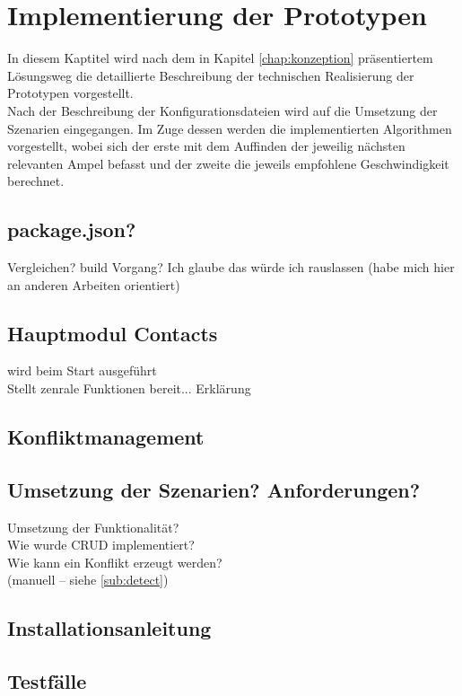 \chapter{\label{chap:implementierung}Implementierung der Prototypen}
In diesem Kaptitel wird nach dem in Kapitel \ref{chap:konzeption} präsentiertem Lösungsweg die detaillierte Beschreibung der technischen Realisierung der Prototypen vorgestellt.\\
Nach der Beschreibung der Konfigurationsdateien wird auf die Umsetzung der Szenarien eingegangen. Im Zuge dessen werden die implementierten Algorithmen vorgestellt, wobei sich der erste mit dem Auffinden der jeweilig nächsten relevanten Ampel befasst und der zweite die jeweils empfohlene Geschwindigkeit berechnet.
%
%
%
\section{package.json?}
Vergleichen? build Vorgang? Ich glaube das würde ich rauslassen (habe mich hier an anderen Arbeiten orientiert)
%
%
%
\section{Hauptmodul Contacts}
wird beim Start ausgeführt\\
Stellt zenrale Funktionen bereit... Erklärung\\
%
%
%
\section{Konfliktmanagement}
%
%
%
\section{Umsetzung der Szenarien? Anforderungen?}
Umsetzung der Funktionalität? \\
Wie wurde CRUD implementiert?\\
Wie kann ein Konflikt erzeugt werden?\\
(manuell -- siehe \ref{sub:detect})
%
%
\section{Installationsanleitung}


%
%
\section{\label{sec:impl:test}Testfälle}
